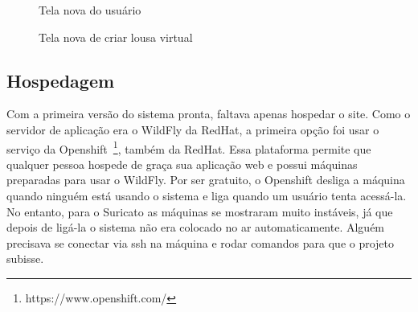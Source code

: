 \begin{figure}[H]
  \centering
  \caption{Tela nova do usuário}\label{figura:indexNovo}
\end{figure}

\begin{figure}[H]
  \centering
  \caption{Tela nova de criar lousa virtual}\label{figura:criarNovo}
\end{figure}

\subsection{Hospedagem}

Com a primeira versão do sistema pronta, faltava apenas hospedar o site. Como o servidor de aplicação era o WildFly da RedHat, a primeira opção foi usar o serviço da Openshift~\footnote{https://www.openshift.com/}, também da RedHat. Essa plataforma permite que qualquer pessoa hospede de graça sua aplicação web e possui máquinas preparadas para usar o WildFly. Por ser gratuito, o Openshift desliga a máquina quando ninguém está usando o sistema e liga quando um usuário tenta acessá-la. No entanto, para o Suricato as máquinas se mostraram muito instáveis, já que depois de ligá-la o sistema não era colocado no ar automaticamente. Alguém precisava se conectar via ssh na máquina e rodar comandos para que o projeto subisse.

